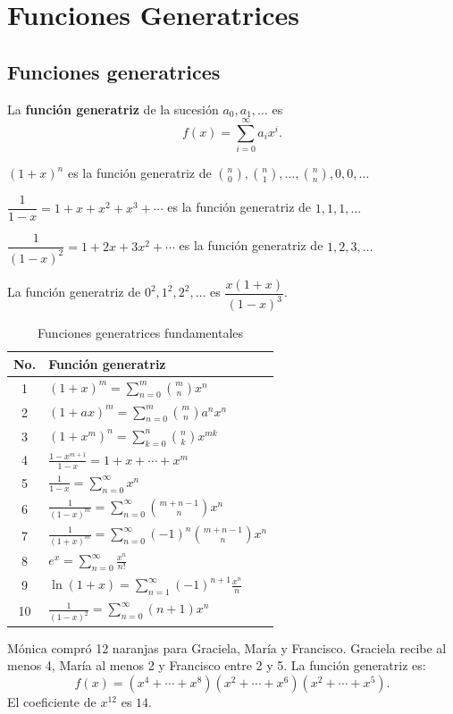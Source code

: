 \chapter{Funciones Generatrices}

\section{Funciones generatrices}

\begin{definicion}
La \textbf{función generatriz} de la sucesión $a_0, a_1, \ldots$ es
\[
f(x) = \sum_{i=0}^{\infty} a_i x^i.
\]
\end{definicion}

\begin{ejemplo}
$(1+x)^n$ es la función generatriz de $\binom{n}{0}, \binom{n}{1}, \ldots, \binom{n}{n}, 0, 0, \ldots$
\end{ejemplo}

\begin{ejemplo}
$\dfrac{1}{1-x} = 1 + x + x^2 + x^3 + \cdots$ es la función generatriz de $1, 1, 1, \ldots$
\end{ejemplo}

\begin{ejemplo}
$\dfrac{1}{(1-x)^2} = 1 + 2x + 3x^2 + \cdots$ es la función generatriz de $1, 2, 3, \ldots$
\end{ejemplo}

\begin{ejemplo}
La función generatriz de $0^2, 1^2, 2^2, \ldots$ es $\dfrac{x(1+x)}{(1-x)^3}$.
\end{ejemplo}

\begin{table}[h]
\centering
\caption{Funciones generatrices fundamentales}
\begin{tabular}{|c|l|}
\hline
\textbf{No.} & \textbf{Función generatriz} \\
\hline
1 & $(1+x)^m = \sum_{n=0}^m \binom{m}{n} x^n$ \\
2 & $(1+ax)^m = \sum_{n=0}^m \binom{m}{n} a^n x^n$ \\
3 & $(1+x^m)^n = \sum_{k=0}^n \binom{n}{k} x^{mk}$ \\
4 & $\frac{1-x^{m+1}}{1-x} = 1+x+\cdots+x^m$ \\
5 & $\frac{1}{1-x} = \sum_{n=0}^{\infty} x^n$ \\
6 & $\frac{1}{(1-x)^m} = \sum_{n=0}^{\infty} \binom{m+n-1}{n} x^n$ \\
7 & $\frac{1}{(1+x)^m} = \sum_{n=0}^{\infty} (-1)^n \binom{m+n-1}{n} x^n$ \\
8 & $e^x = \sum_{n=0}^{\infty} \frac{x^n}{n!}$ \\
9 & $\ln(1+x) = \sum_{n=1}^{\infty} (-1)^{n+1}\frac{x^n}{n}$ \\
10 & $\frac{1}{(1-x)^2} = \sum_{n=0}^{\infty} (n+1)x^n$ \\
\hline
\end{tabular}
\end{table}

\begin{ejemplo}
Mónica compró 12 naranjas para Graciela, María y Francisco. Graciela recibe al menos 4, María al menos 2 y Francisco entre 2 y 5. La función generatriz es:
\[
f(x) = (x^4 + \cdots + x^8)(x^2 + \cdots + x^6)(x^2 + \cdots + x^5).
\]
El coeficiente de $x^{12}$ es $14$.
\end{ejemplo}